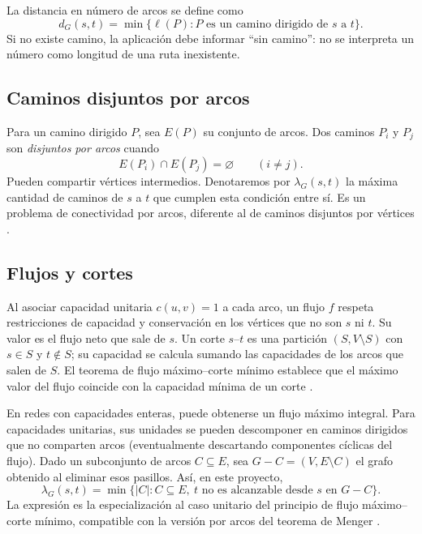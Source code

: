 \documentclass[11pt,a4paper]{article}
\begin{document}
La distancia en número de arcos se define como
\begin{equation}\label{eq:distancia}
d_G(s,t)=\min\{\ell(P):P\text{ es un camino dirigido de }s\text{ a }t\}.
\end{equation}
Si no existe camino, la aplicación debe informar \enquote{sin camino}: no se interpreta un número como longitud de una ruta inexistente.

\subsection{Caminos disjuntos por arcos}
Para un camino dirigido $P$, sea $E(P)$ su conjunto de arcos. Dos caminos $P_i$ y $P_j$ son \emph{disjuntos por arcos} cuando
\begin{equation}\label{eq:disjuntos}
E(P_i)\cap E(P_j)=\varnothing\qquad (i\ne j).
\end{equation}
Pueden compartir vértices intermedios. Denotaremos por $\lambda_G(s,t)$ la máxima cantidad de caminos de $s$ a $t$ que cumplen esta condición entre sí. Es un problema de conectividad por arcos, diferente al de caminos disjuntos por vértices \cite{kleinberg2006}.

\subsection{Flujos y cortes}
Al asociar capacidad unitaria $c(u,v)=1$ a cada arco, un flujo $f$ respeta restricciones de capacidad y conservación en los vértices que no son $s$ ni $t$. Su valor es el flujo neto que sale de $s$. Un corte $s$--$t$ es una partición $(S,V\setminus S)$ con $s\in S$ y $t\notin S$; su capacidad se calcula sumando las capacidades de los arcos que salen de $S$. El teorema de flujo máximo--corte mínimo establece que el máximo valor del flujo coincide con la capacidad mínima de un corte \cite{ford1956,kleinberg2006,sedgewick2011}.

En redes con capacidades enteras, puede obtenerse un flujo máximo integral. Para capacidades unitarias, sus unidades se pueden descomponer en caminos dirigidos que no comparten arcos (eventualmente descartando componentes cíclicas del flujo). Dado un subconjunto de arcos $C\subseteq E$, sea $G-C=(V,E\setminus C)$ el grafo obtenido al eliminar esos pasillos. Así, en este proyecto,
\begin{equation}\label{eq:minmax}
\boxed{\lambda_G(s,t)=\min\{|C|:C\subseteq E,\ t\text{ no es alcanzable desde }s\text{ en }G-C\}.}
\end{equation}
La expresión es la especialización al caso unitario del principio de flujo máximo--corte mínimo, compatible con la versión por arcos del teorema de Menger \cite{ford1956,kleinberg2006}.
\end{document}
